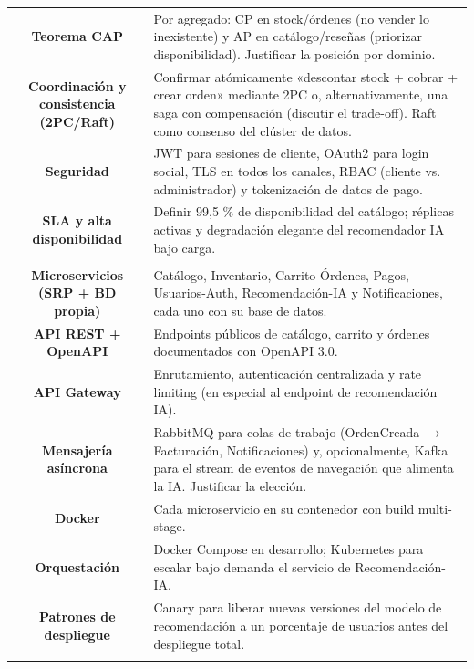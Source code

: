 \documentclass[11pt]{article}
\begin{document}
\begin{longtable}{C A}
\textbf{Teorema CAP} & Por agregado: CP en stock/órdenes (no vender lo inexistente) y AP en catálogo/reseñas (priorizar disponibilidad). Justificar la posición por dominio.\\
\textbf{Coordinación y consistencia (2PC/Raft)} & Confirmar atómicamente «descontar stock + cobrar + crear orden» mediante 2PC o, alternativamente, una saga con compensación (discutir el trade-off). Raft como consenso del clúster de datos.\\
\textbf{Seguridad} & JWT para sesiones de cliente, OAuth2 para login social, TLS en todos los canales, RBAC (cliente vs. administrador) y tokenización de datos de pago.\\
\textbf{SLA y alta disponibilidad} & Definir 99,5 \% de disponibilidad del catálogo; réplicas activas y degradación elegante del recomendador IA bajo carga.\\
\addlinespace[1pt]
\\
\textbf{Microservicios (SRP + BD propia)} & Catálogo, Inventario, Carrito-Órdenes, Pagos, Usuarios-Auth, Recomendación-IA y Notificaciones, cada uno con su base de datos.\\
\textbf{API REST + OpenAPI} & Endpoints públicos de catálogo, carrito y órdenes documentados con OpenAPI 3.0.\\
\textbf{API Gateway} & Enrutamiento, autenticación centralizada y rate limiting (en especial al endpoint de recomendación IA).\\
\textbf{Mensajería asíncrona} & RabbitMQ para colas de trabajo (OrdenCreada $\rightarrow$ Facturación, Notificaciones) y, opcionalmente, Kafka para el stream de eventos de navegación que alimenta la IA. Justificar la elección.\\
\textbf{Docker} & Cada microservicio en su contenedor con build multi-stage.\\
\textbf{Orquestación} & Docker Compose en desarrollo; Kubernetes para escalar bajo demanda el servicio de Recomendación-IA.\\
\textbf{Patrones de despliegue} & Canary para liberar nuevas versiones del modelo de recomendación a un porcentaje de usuarios antes del despliegue total.\\
\addlinespace[1pt]

\end{longtable}
\end{document}
